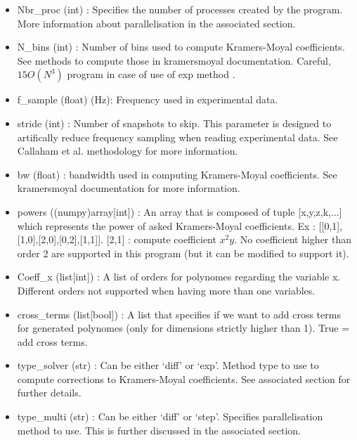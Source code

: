 \documentclass[A4paper]{article}
\begin{document}
\begin{itemize}
\item Nbr\_proc (int) : Specifies the number of processes created by the program. More information about parallelisation in the associated section.

\item N\_bins (int) : Number of bins used to compute Kramers-Moyal coefficients. See methods to compute those in kramersmoyal documentation. Careful, $15O(N^3)$ program in case of use of exp method \cite{Moler2003}.

\item f\_sample (float) (Hz): Frequency used in experimental data.

\item stride (int) : Number of snapshots to skip. This parameter is designed to artifically reduce frequency sampling when reading experimental data. See Callaham et al. methodology for more information.

\item bw (float) : bandwidth used in computing Kramers-Moyal coefficients. See kramersmoyal documentation for more information.

\item powers ((numpy)array[int]) : An array that is composed of tuple [x,y,z,k,...] which represents the power of asked Kramers-Moyal coefficients. Ex : [[0,1],[1,0],[2,0],[0,2],[1,1]].
[2,1] :  compute coefficient $x^2y$. No coefficient higher than order 2 are supported in this program (but it can be modified to support it).

\item Coeff\_x (list[int]) : A list of orders for polynomes regarding the variable x. Different orders not supported when having more than one variables.

\item cross\_terms (list[bool]) : A list that specifies if we want to add cross terms for generated polynomes (only for dimensions strictly higher than 1). True = add cross terms.

\item type\_solver (str) : Can be either `diff' or `exp'. Method type to use to compute corrections to Kramers-Moyal coefficients. See associated section for further details.

\item type\_multi (str) : Can be either `diff' or `step'. Specifies parallelisation method to use. This is further discussed in the associated section.


\end{itemize}
\end{document}
